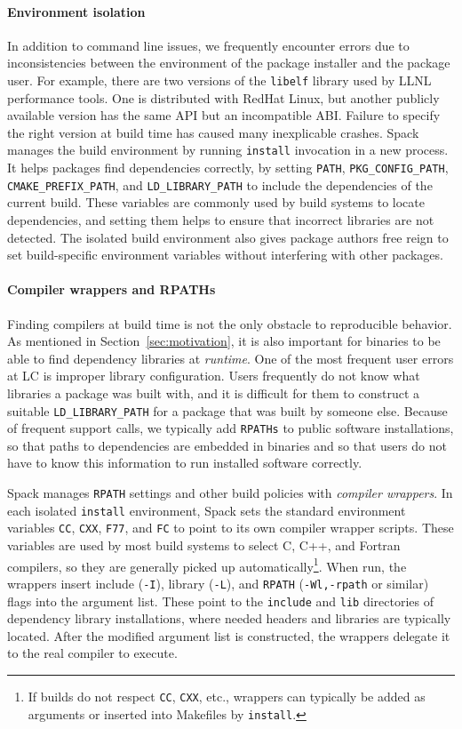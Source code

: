 \paragraph{Environment isolation}
In addition to command line issues, we
frequently encounter errors due to inconsistencies between the environment of
the package installer and the package user.
%
For example, there are two versions of the {\tt libelf} library used by
LLNL performance tools. One is distributed with RedHat Linux, but another
publicly available version has the same API but an incompatible ABI.
Failure to specify the right version at build time has caused many
inexplicable crashes.
%
Spack manages the build environment by running {\tt install} invocation
in a new process.  It helps packages find dependencies 
correctly, by setting
{\tt PATH}, {\tt PKG\_CONFIG\_PATH}, {\tt CMAKE\_PREFIX\_PATH}, and
{\tt LD\_LIBRARY\_PATH} to include the dependencies of the current build.
These variables are commonly used by build systems to locate dependencies,
and setting them helps to ensure that incorrect libraries are not detected.
The isolated build environment also gives package authors 
free reign to set build-specific environment variables without interfering
with other packages.


\paragraph{Compiler wrappers and RPATHs}
Finding compilers at build time is not the only obstacle to reproducible
behavior.  As mentioned in Section~\ref{sec:motivation}, it is also important
for binaries to be able to find dependency libraries at {\it runtime}.
One of the most frequent user errors at LC is improper library configuration.
Users frequently do not know what libraries a package was built with, and 
it is difficult for them to construct a suitable {\tt LD\_LIBRARY\_PATH} for
a package that was built by someone else.  Because of frequent support calls,
we typically add {\tt RPATHs} to public software installations, so that paths
to dependencies are embedded in binaries and so that users do not have to know
this information to run installed software correctly.

Spack manages {\tt RPATH} settings and other build policies with
{\it compiler wrappers}. 
In each isolated {\tt install} environment, Spack sets the standard 
environment variables
{\tt CC}, {\tt CXX}, {\tt F77}, and {\tt FC} to point to its own compiler
wrapper scripts.  These variables are used by most build systems to select
C, C++, and Fortran compilers, so they are generally picked up 
automatically\footnote{If builds do not respect {\tt CC}, {\tt CXX}, etc.,
wrappers can typically be added as arguments or inserted into Makefiles
by {\tt install}.}.
When run, the wrappers insert include ({\tt -I}), library ({\tt -L}), and 
{\tt RPATH} ({\tt -Wl,-rpath} or similar) flags into the argument list.
These point to the {\tt include} and {\tt lib} directories of dependency
library installations, where needed headers and libraries are typically located.
After the modified argument list is constructed, the wrappers delegate it
to the real compiler to execute.

